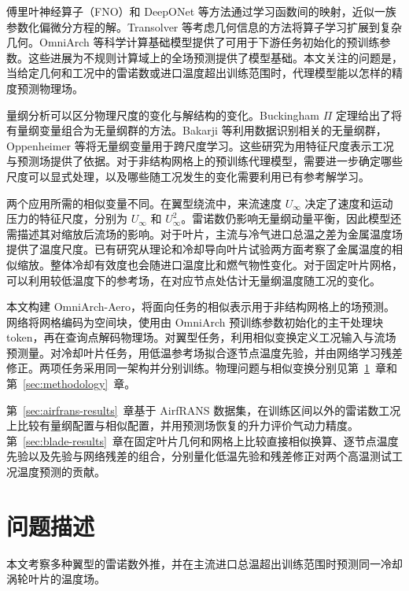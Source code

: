 \documentclass[a4paper,fleqn]{cas-sc}
\newcommand{\sectionbudget}[2][初稿可供审阅]{%
  \noindent{\small\textbf{版面预算}\enspace 约 #2 页\quad
    \textbf{状态}\enspace #1}\par\nobreak
}
\begin{document}
傅里叶神经算子（FNO）和 DeepONet 等方法通过学习函数间的映射，近似一族参数化偏微分方程的解\citep{Li2021FNO,Lu2021DeepONet}。Transolver 等考虑几何信息的方法将算子学习扩展到复杂几何\citep{Wu2024Transolver}。OmniArch 等科学计算基础模型提供了可用于下游任务初始化的预训练参数\citep{Chen2025OmniArch}。这些进展为不规则计算域上的全场预测提供了模型基础。本文关注的问题是，当给定几何和工况中的雷诺数或进口温度超出训练范围时，代理模型能以怎样的精度预测物理场。

量纲分析可以区分物理尺度的变化与解结构的变化。Buckingham \(\Pi\) 定理给出了将有量纲变量组合为无量纲群的方法\citep{Buckingham1914}。Bakarji 等利用数据识别相关的无量纲群\citep{Bakarji2022}，Oppenheimer 等将无量纲变量用于跨尺度学习\citep{Oppenheimer2023}。这些研究为用特征尺度表示工况与预测场提供了依据。对于非结构网格上的预训练代理模型，需要进一步确定哪些尺度可以显式处理，以及哪些随工况发生的变化需要利用已有参考解学习。

两个应用所需的相似变量不同。在翼型绕流中，来流速度 \(U_\infty\) 决定了速度和运动压力的特征尺度，分别为 \(U_\infty\) 和 \(U_\infty^2\)。雷诺数仍影响无量纲动量平衡，因此模型还需描述其对缩放后流场的影响。对于叶片，主流与冷气进口总温之差为金属温度场提供了温度尺度。已有研究从理论和冷却导向叶片试验两方面考察了金属温度的相似缩放\citep{Luque2016,Luque2017}。整体冷却有效度也会随进口温度比和燃气物性变化\citep{Cartlidge2024}。对于固定叶片网格，可以利用较低温度下的参考场，在对应节点处估计无量纲温度随工况的变化。

本文构建 OmniArch-Aero，将面向任务的相似表示用于非结构网格上的场预测。网络将网格编码为空间块，使用由 OmniArch 预训练参数初始化的主干处理块 token，再在查询点解码物理场。对翼型任务，利用相似变换定义工况输入与流场预测量。对冷却叶片任务，用低温参考场拟合逐节点温度先验，并由网络学习残差修正。两项任务采用同一架构并分别训练。物理问题与相似变换分别见第~\ref{sec:problem-statement}~章和第~\ref{sec:methodology}~章。

第~\ref{sec:airfrans-results}~章基于 AirfRANS 数据集\citep{Bonnet2022AirfRANS}，在训练区间以外的雷诺数工况上比较有量纲配置与相似配置，并用预测场恢复的升力评价气动力精度。第~\ref{sec:blade-results}~章在固定叶片几何和网格上比较直接相似换算、逐节点温度先验以及先验与网络残差的组合，分别量化低温先验和残差修正对两个高温测试工况温度预测的贡献。

\section{问题描述}\label{sec:problem-statement}
\sectionbudget{2}

本文考察多种翼型的雷诺数外推，并在主流进口总温超出训练范围时预测同一冷却涡轮叶片的温度场。
\end{document}
